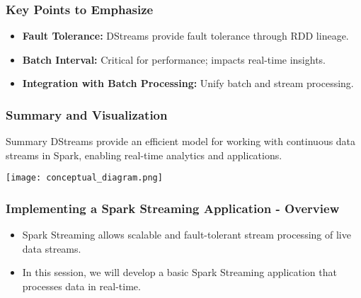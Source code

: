 \documentclass[aspectratio=169]{beamer}
\begin{document}
\begin{frame}
    \frametitle{Key Points to Emphasize}
    \begin{itemize}
        \item \textbf{Fault Tolerance:} DStreams provide fault tolerance through RDD lineage.
        \item \textbf{Batch Interval:} Critical for performance; impacts real-time insights.
        \item \textbf{Integration with Batch Processing:} Unify batch and stream processing.
    \end{itemize}
\end{frame}

\begin{frame}
    \frametitle{Summary and Visualization}
    \begin{block}{Summary}
        DStreams provide an efficient model for working with continuous data streams in Spark, enabling real-time analytics and applications.
    \end{block}
    \begin{center}
        \texttt{[image: conceptual\_diagram.png]}
    \end{center}
\end{frame}

\begin{frame}[fragile]
    \frametitle{Implementing a Spark Streaming Application - Overview}
    \begin{itemize}
        \item Spark Streaming allows scalable and fault-tolerant stream processing of live data streams.
        \item In this session, we will develop a basic Spark Streaming application that processes data in real-time.
    \end{itemize}
\end{frame}
\end{document}
